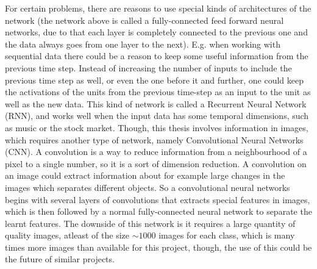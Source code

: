 For certain problems, there are reasons to use special kinds of architectures of the network (the network above is called a fully-connected feed forward neural networks, due to that each layer is completely connected to the previous one and the data always goes from one layer to the next). E.g. when working with sequential data there could be a reason to keep some useful information from the previous time step. Instead of increasing the number of inputs to include the previous time step as well, or even the one before it and further, one could keep the activations of the units from the previous time-step as an input to the unit as well as the new data. This kind of network is called a Recurrent Neural Network (RNN), and works well when the input data has some temporal dimensions, such as music or the stock market. Though, this thesis involves information in images, which requires another type of network, namely Convolutional Neural Networks (CNN). A convolution is a way to reduce information from a neighbourhood of a pixel to a single number, so it is a sort of dimension reduction. A convolution on an image could extract information about for example large changes in the images which separates different objects. So a convolutional neural networks begins with several layers of convolutions that extracts special features in images, which is then followed by a normal fully-connected neural network to separate the learnt features. The downside of this network is it requires a large quantity of quality images, atleast of the size $\sim 1000$ images for each class, which is many times more images than available for this project, though, the use of this could be the future of similar projects.
